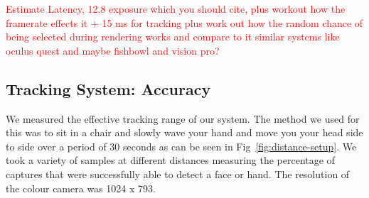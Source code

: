 \textcolor{red}{Estimate Latency, 12.8 exposure which you should cite, plus workout how the framerate effects it + 15 ms for tracking plus work out how the random chance of being selected during rendering works and compare to it similar systems like oculus quest and maybe fishbowl and vision pro?} 


\subsection{Tracking System: Accuracy}

We measured the effective tracking range of our system. The method we used for this was to sit in a chair and slowly wave your hand and move you your head side to side over a period of 30 seconds as can be seen in Fig~\ref{fig:distance-setup}. We took a variety of samples at different distances measuring the percentage of captures that were successfully able to detect a face or hand. The resolution of the colour camera was 1024 x 793. 

\begin{invisBox}  
	\hfill
\end{invisBox}

